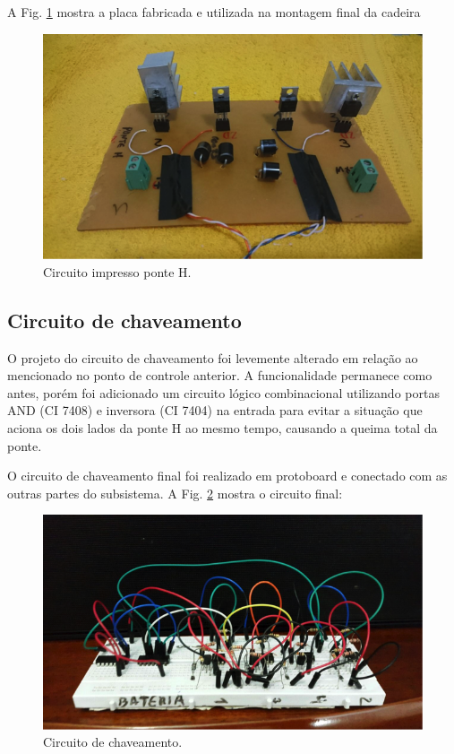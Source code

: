 A Fig. \ref{fig:ponte_h.png} mostra a placa fabricada e utilizada na montagem final da cadeira

\begin{figure}
    \begin{center}
        \includegraphics{figuras/ponte_h.png}
    \end{center}
    \caption{Circuito impresso ponte H.}
    \label{fig:ponte_h.png}
\end{figure}

\subsection{Circuito de chaveamento}

O projeto do circuito de chaveamento foi levemente alterado em relação ao mencionado no ponto de controle anterior. A funcionalidade permanece como antes, porém foi adicionado um circuito lógico combinacional utilizando portas AND (CI 7408) e inversora (CI 7404) na entrada para evitar a situação que aciona os dois lados da ponte H ao mesmo tempo, causando a queima total da ponte.

O circuito de chaveamento final foi realizado em protoboard e conectado com as outras partes do subsistema. A Fig. \ref{fig:circuito_chaveamento.png} mostra o circuito final:

\begin{figure}
    \begin{center}
        \includegraphics{figuras/circuito_chaveamento.png}
    \end{center}
    \caption{Circuito de chaveamento.}
    \label{fig:circuito_chaveamento.png}
\end{figure}

